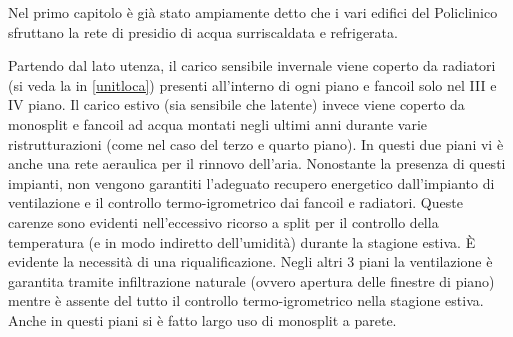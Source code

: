 Nel primo capitolo è già stato ampiamente detto che i vari edifici del Policlinico sfruttano la rete di presidio di acqua surriscaldata e refrigerata.

Partendo dal lato utenza, il carico sensibile invernale viene coperto da radiatori (si veda la  in \vref{unitloca}) presenti all'interno di ogni piano e fancoil solo nel III e IV piano. Il carico estivo (sia sensibile che latente) invece viene coperto da monosplit e fancoil ad acqua montati negli ultimi anni durante varie ristrutturazioni (come nel caso del terzo e quarto piano). In questi due piani vi è anche una rete aeraulica per il rinnovo dell'aria. Nonostante la presenza di questi impianti, non vengono garantiti l'adeguato recupero energetico dall'impianto di ventilazione e il controllo termo-igrometrico dai fancoil e radiatori. Queste carenze sono evidenti nell'eccessivo ricorso a split per il controllo della temperatura (e in modo indiretto dell'umidità) durante la stagione estiva. È evidente la necessità di una riqualificazione. Negli altri 3 piani la ventilazione è garantita tramite infiltrazione naturale (ovvero apertura delle finestre di piano) mentre è assente del tutto il controllo termo-igrometrico nella stagione estiva. Anche in questi piani si è fatto largo uso di monosplit a parete.

